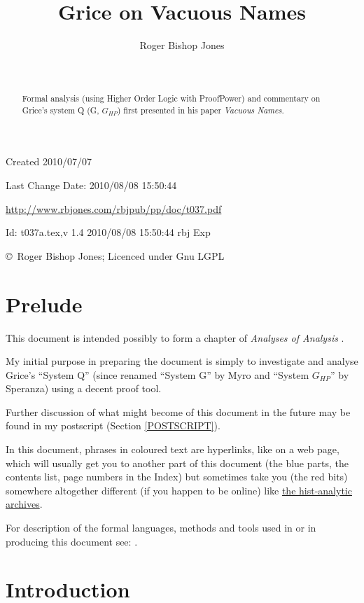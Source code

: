 \documentclass[11pt]{article}
\title{Grice on Vacuous Names}
\author{Roger Bishop Jones}
\date{\ }
\begin{document}
\begin{titlepage}
\maketitle
\begin{abstract}
Formal analysis (using Higher Order Logic with ProofPower) and commentary on Grice's system Q (G, $G_{HP}$) first presented in his paper \emph{Vacuous Names}.
\end{abstract}
\vfill

\begin{centering}
{\footnotesize

Created 2010/07/07

Last Change $ $Date: 2010/08/08 15:50:44 $ $

\href{http://www.rbjones.com/rbjpub/pp/doc/t037.pdf}
{http://www.rbjones.com/rbjpub/pp/doc/t037.pdf}

$ $Id: t037a.tex,v 1.4 2010/08/08 15:50:44 rbj Exp $ $

\copyright\ Roger Bishop Jones; Licenced under Gnu LGPL

}%
\end{centering}

\thispagestyle{empty}
\end{titlepage}

\newpage
\addtocounter{page}{1}
{\parskip=0pt\tableofcontents}

\section{Prelude}

This document is intended possibly to form a chapter of {\it Analyses of Analysis} \cite{rbjb003}.

My initial purpose in preparing the document is simply to investigate and analyse Grice's ``System Q'' (since renamed ``System G'' by Myro and ``System $G_{HP}$'' by Speranza) using a decent proof tool.

Further discussion of what might become of this document in the future may be found in my postscript (Section \ref{POSTSCRIPT}).

In this document, phrases in coloured text are hyperlinks, like on a web page, which will usually get you to another part of this document (the blue parts, the contents list, page numbers in the Index) but sometimes take you (the red bits) somewhere altogether different (if you happen to be online) like \href{http://rbjones.com/pipermail/hist-analytic_rbjones.com}{the hist-analytic archives}.

For description of the formal languages, methods and tools used in or in producing this document see: \cite{rbjt029}.

\section{Introduction}
\end{document}
